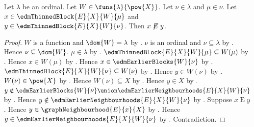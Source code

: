 \begin{proposition}\label{edm_thinned_blocks_cross_nonedge}
    Let $\lambda$ be an ordinal.
    Let $W\in\funs{\lambda}{\pow{X}}$.
    Let $\nu\in\lambda$ and $\mu\in\nu$.
    Let $x\in\edmThinnedBlock{E}{X}{W}{\mu}$ and
        $y\in\edmThinnedBlock{E}{X}{W}{\nu}$.
    Then $x\not\mathrel{E}y$.
\end{proposition}
\begin{proof}
    $W$ is a function and $\dom{W}=\lambda$ by
        .
    $\nu$ is an ordinal and $\nu\subseteq\lambda$ by
        .
    Hence $\nu\subseteq\dom{W}$.
    $\mu\in\lambda$ by .
    $\edmThinnedBlock{E}{X}{W}{\mu}\subseteq W(\mu)$ by
        .
    Hence $x\in W(\mu)$ by .
    Hence $x\in\edmEarlierBlocks{W}{\nu}$ by
        .
    $\edmThinnedBlock{E}{X}{W}{\nu}\subseteq W(\nu)$ by
        .
    Hence $y\in W(\nu)$ by .
    $W(\nu)\in\pow{X}$ by .
    Hence $W(\nu)\subseteq X$ by .
    Hence $y\in X$ by .
    $y\notin\edmEarlierBlocks{W}{\nu}\union
        \edmEarlierNeighbourhoods{E}{X}{W}{\nu}$ by
        .
    Hence $y\notin\edmEarlierNeighbourhoods{E}{X}{W}{\nu}$ by
        .
    Suppose $x\mathrel{E}y$.
    Hence $y\in\graphNeighbourhood{E}{x}{X}$ by
        .
    Hence $y\in\edmEarlierNeighbourhoods{E}{X}{W}{\nu}$ by
        .
    Contradiction.
\end{proof}

